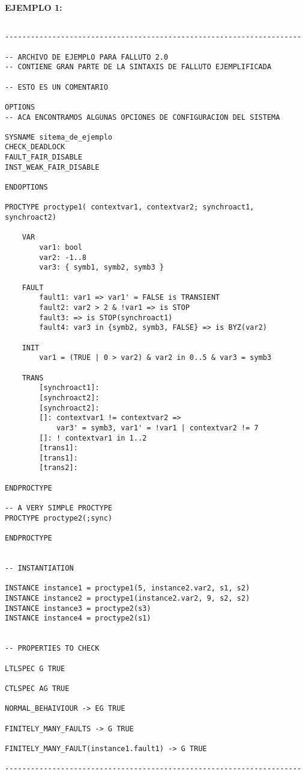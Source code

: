 \documentclass[titlepage, 12pt]{book}
\begin{document}
\textbf{EJEMPLO 1:}\\

\begin{verbatim}

---------------------------------------------------------------------

-- ARCHIVO DE EJEMPLO PARA FALLUTO 2.0
-- CONTIENE GRAN PARTE DE LA SINTAXIS DE FALLUTO EJEMPLIFICADA

-- ESTO ES UN COMENTARIO 

OPTIONS
-- ACA ENCONTRAMOS ALGUNAS OPCIONES DE CONFIGURACION DEL SISTEMA

SYSNAME sitema_de_ejemplo
CHECK_DEADLOCK
FAULT_FAIR_DISABLE
INST_WEAK_FAIR_DISABLE

ENDOPTIONS

PROCTYPE proctype1( contextvar1, contextvar2; synchroact1, synchroact2)

    VAR
        var1: bool
        var2: -1..8
        var3: { symb1, symb2, symb3 }

    FAULT
        fault1: var1 => var1' = FALSE is TRANSIENT
        fault2: var2 > 2 & !var1 => is STOP
        fault3: => is STOP(synchroact1)
        fault4: var3 in {symb2, symb3, FALSE} => is BYZ(var2)

    INIT
        var1 = (TRUE | 0 > var2) & var2 in 0..5 & var3 = symb3

    TRANS
        [synchroact1]:
        [synchroact2]:
        [synchroact2]: 
        []: contextvar1 != contextvar2 => 
            var3' = symb3, var1' = !var1 | contextvar2 != 7
        []: ! contextvar1 in 1..2
        [trans1]:
        [trans1]:
        [trans2]:

ENDPROCTYPE

-- A VERY SIMPLE PROCTYPE
PROCTYPE proctype2(;sync)

ENDPROCTYPE


-- INSTANTIATION

INSTANCE instance1 = proctype1(5, instance2.var2, s1, s2)
INSTANCE instance2 = proctype1(instance2.var2, 9, s2, s2)
INSTANCE instance3 = proctype2(s3)
INSTANCE instance4 = proctype2(s1)


-- PROPERTIES TO CHECK

LTLSPEC G TRUE

CTLSPEC AG TRUE

NORMAL_BEHAIVIOUR -> EG TRUE

FINITELY_MANY_FAULTS -> G TRUE

FINITELY_MANY_FAULT(instance1.fault1) -> G TRUE

---------------------------------------------------------------------
\end{verbatim}
~\\
\end{document}
